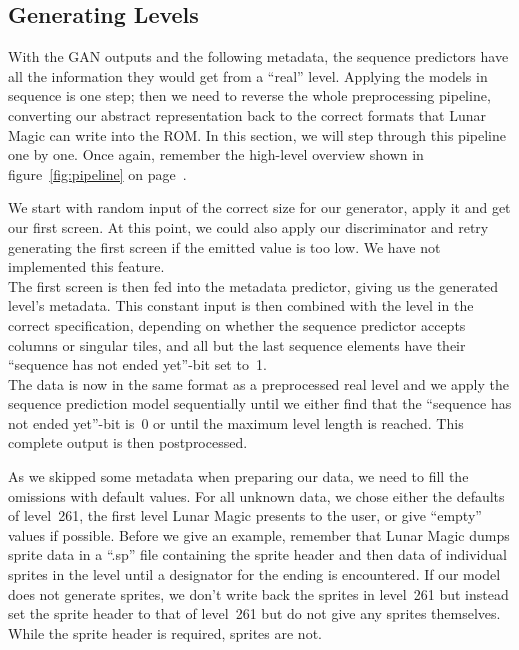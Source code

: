 \subsection{Generating Levels}
\label{sec:generating-levels}

With the GAN outputs and the following metadata, the sequence
predictors have all the information they would get from a ``real''
level. Applying the models in sequence is one step; then we need to
reverse the whole preprocessing pipeline, converting our abstract
representation back to the correct formats that Lunar Magic can write
into the ROM. In this section, we will step through this pipeline one
by one. Once again, remember the high-level overview shown in
figure~\ref{fig:pipeline} on page~\pageref{fig:pipeline}.

We start with random input of the correct size for our generator,
apply it and get our first screen. At this point, we could also apply
our discriminator and retry generating the first screen if the emitted
value is too low. We have not implemented this feature. \\
The first screen is then fed into the metadata predictor, giving us
the generated level's metadata. This constant input is then combined
with the level in the correct specification, depending on whether the
sequence predictor accepts columns or singular tiles, and all but the
last sequence elements have their ``sequence has not ended yet''-bit
set to~1. \\
The data is now in the same format as a preprocessed real level and we
apply the sequence prediction model sequentially until we either find
that the ``sequence has not ended yet''-bit is~0 or until the maximum
level length is reached. This complete output is then postprocessed.

As we skipped some metadata when preparing our data, we need to fill
the omissions with default values. For all unknown data, we chose
either the defaults of level~261, the first level Lunar Magic presents
to the user, or give ``empty'' values if possible. Before we give an
example, remember that Lunar Magic dumps sprite data in a ``.sp'' file
containing the sprite header and then data of individual sprites in
the level until a designator for the ending is encountered. If our
model does not generate sprites, we don't write back the sprites in
level~261 but instead set the sprite header to that of level~261 but
do not give any sprites themselves. While the sprite header is
required, sprites are not.

